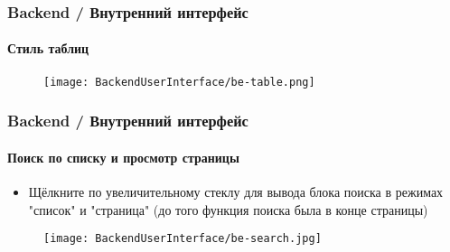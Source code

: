 
\begin{frame}[fragile]
	\frametitle{Backend / Внутренний интерфейс}
	\framesubtitle{Стиль таблиц}

	\begin{figure}
		\texttt{[image: BackendUserInterface/be-table.png]}
	\end{figure}

\end{frame}


\begin{frame}[fragile]
	\frametitle{Backend / Внутренний интерфейс}
	\framesubtitle{Поиск по списку и просмотр страницы}

	\begin{itemize}
		\item Щёлкните по увеличительному стеклу для вывода блока поиска в режимах "список" и "страница"\newline
			(до того функция поиска была в конце страницы)
	\end{itemize}

	\begin{figure}
		\texttt{[image: BackendUserInterface/be-search.jpg]}
	\end{figure}

\end{frame}


